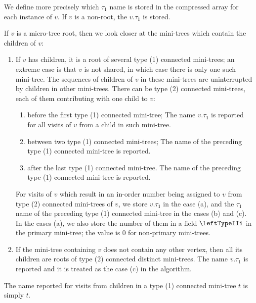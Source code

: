We define more precisely which $\tau_1$ name is stored in the compressed array for each instance of $v$.
If $v$ is a non-root, the $v.\tau_1$ is stored.

If $v$ is a micro-tree root, then we look closer at the mini-trees which contain the children of $v$:
\begin{enumerate}
	\item If $v$ has children, it is a root of several type (1) connected mini-trees; an extreme case is that $v$ is not shared, in which case there is only one such mini-tree.
	The sequences of children of $v$ in these mini-trees are uninterrupted by children in other mini-trees.
	There can be type (2) connected mini-trees, each of them contributing with one child to $v$:
	\begin{enumerate}
		\item before the first type (1) connected mini-tree;
		The name $v.\tau_1$ is reported for all visits of $v$ from a child in such mini-tree.
		
		\item between two type (1) connected mini-trees;
		The name of the preceding type (1) connected mini-tree is reported.
		
		\item after the last type (1) connected mini-tree.
		The name of the preceding type (1) connected mini-tree is reported.
	\end{enumerate}
	For visits of $v$ which result in an in-order number being assigned to $v$ from type (2) connected mini-trees of $v$, we store $v.\tau_1$ in the case (a), and the $\tau_1$ name of the preceding type (1) connected mini-tree in the cases (b) and (c).
	In the cases (a), we also store the number of them in a field $\leftTypeIIi$ in the primary mini-tree; the value is $0$ for non-primary mini-trees.
	
	\item If the mini-tree containing $v$ does not contain any other vertex, then all its children are roots of type (2) connected distinct mini-trees.
	The name $v.\tau_1$ is reported and it is treated as the case (c) in the algorithm.
\end{enumerate}
The name reported for visits from children in a type (1) connected mini-tree $t$ is simply $t$.

